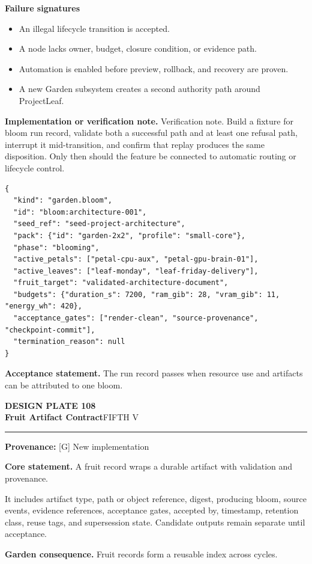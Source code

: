 \documentclass[10pt,letterpaper,oneside]{article}
\newcommand{\prov}[1]{\textcolor{gardenBlue}{\sffamily\footnotesize\textbf{Provenance:} #1}}
\newcommand{\platetitle}[3]{%
  \begin{minipage}[t][0.54in][t]{\textwidth}
  {\sffamily\bfseries\color{gardenDeep}\fontsize{9}{10}\selectfont DESIGN PLATE #1}\\[-1pt]
  {\sffamily\bfseries\color{gardenInk}\fontsize{16.5}{18}\selectfont #2}\hfill{\sffamily\color{gardenGreen}\large #3}
  \end{minipage}\vspace{-2pt}\hrule\vspace{5pt}}
\begin{document}
\textbf{Failure signatures}
\begin{itemize}
\item An illegal lifecycle transition is accepted.
\item A node lacks owner, budget, closure condition, or evidence path.
\item Automation is enabled before preview, rollback, and recovery are proven.
\item A new Garden subsystem creates a second authority path around ProjectLeaf.
\end{itemize}
\textbf{Implementation or verification note.} Verification note. Build a fixture for bloom run record, validate both a successful path and at least one refusal path, interrupt it mid-transition, and confirm that replay produces the same disposition. Only then should the feature be connected to automatic routing or lifecycle control.

\begin{lstlisting}
{
  "kind": "garden.bloom",
  "id": "bloom:architecture-001",
  "seed_ref": "seed-project-architecture",
  "pack": {"id": "garden-2x2", "profile": "small-core"},
  "phase": "blooming",
  "active_petals": ["petal-cpu-aux", "petal-gpu-brain-01"],
  "active_leaves": ["leaf-monday", "leaf-friday-delivery"],
  "fruit_target": "validated-architecture-document",
  "budgets": {"duration_s": 7200, "ram_gib": 28, "vram_gib": 11, "energy_wh": 420},
  "acceptance_gates": ["render-clean", "source-provenance", "checkpoint-commit"],
  "termination_reason": null
}
\end{lstlisting}
\begin{acceptbox}
\textbf{Acceptance statement.} The run record passes when resource use and artifacts can be attributed to one bloom.
\end{acceptbox}
\newpage
\platetitle{108}{Fruit Artifact Contract}{FIFTH V}
\prov{[G] New implementation}
\fontsize{8.85}{10.45}\selectfont
\begin{corebox}
\textbf{Core statement.} A fruit record wraps a durable artifact with validation and provenance.
\end{corebox}
It includes artifact type, path or object reference, digest, producing bloom, source events, evidence references, acceptance gates, accepted by, timestamp, retention class, reuse tags, and supersession state. Candidate outputs remain separate until acceptance.

\textbf{Garden consequence.} Fruit records form a reusable index across cycles.
\end{document}
